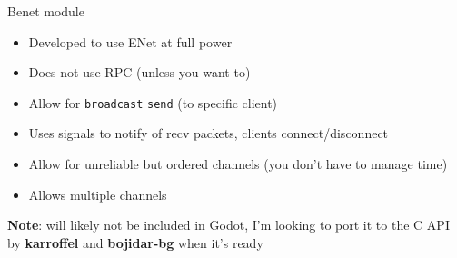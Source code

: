 \begin{frame}{Benet module}

\begin{itemize}
    \item Developed to use ENet at full power
    \item Does not use RPC (unless you want to)
    \item Allow for \texttt{broadcast} \texttt{send} (to specific client)
    \item Uses signals to notify of recv packets, clients connect/disconnect
    \item Allow for unreliable but ordered channels (you don't have to manage time)
    \item Allows multiple channels
\end{itemize}

\footnotesize{\textbf{Note}: will likely not be included in Godot, I'm looking to port it to the C API by \textbf{karroffel} and \textbf{bojidar-bg} when it's ready}

\end{frame}